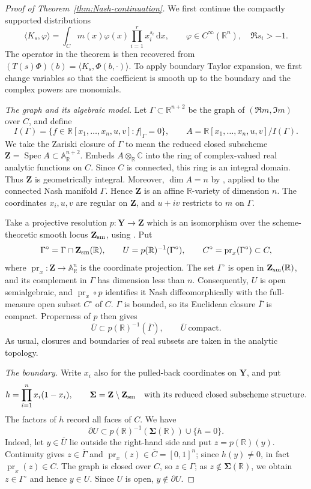 \documentclass[a4paper,12pt]{amsart}
\numberwithin{equation}{section}
\theoremstyle{definition}
\theoremstyle{remark}
\newcommand{\R}{\mathbb R}
\newcommand{\C}{\mathbb C}
\newcommand{\pr}{\operatorname{pr}}
\newcommand{\dd}{\mathrm d}
\begin{document}
\begin{proof}[Proof of Theorem~\ref{thm:Nash-continuation}]
We first continue the compactly supported distributions
\[
 \langle K_s,\varphi\rangle
 =\int_Cm(x)\varphi(x)\prod_{i=1}^r x_i^{s_i}\,\dd x,
 \qquad \varphi\in C^\infty(\R^n),\quad \Re s_i>-1.
\]
The operator in the theorem is then recovered from
$(T(s)\Phi)(b)=\langle K_s,\Phi(b,\cdot)\rangle$.
To apply boundary Taylor expansion, we first change variables so that the coefficient is smooth up to the boundary and the complex powers are monomials.

\emph{The graph and its algebraic model.}
Let $\Gamma\subset\R^{n+2}$ be the graph of $(\Re m,\Im m)$ over $C$, and define
\[
 I(\Gamma)=\{f\in\R[x_1,\ldots,x_n,u,v]:f|_\Gamma=0\},
 \qquad
 A=\R[x_1,\ldots,x_n,u,v]/I(\Gamma).
\]
We take the Zariski closure of $\Gamma$ to mean the reduced closed subscheme
$\mathbf Z=\operatorname{Spec}A\subset\mathbb A^{n+2}_{\R}$.
Embeds $A\otimes_\R\C$ into the ring of complex-valued real analytic functions on $C$. Since $C$ is connected, this ring is an integral domain. Thus $\mathbf Z$ is geometrically integral. Moreover, $\dim A=n$ by \cite[Proposition~8.4.1(i)]{BCR98}, applied to the connected Nash manifold $\Gamma$. Hence $\mathbf Z$ is an affine $\R$-variety of dimension $n$.
The coordinates $x_i,u,v$ are regular on $\mathbf Z$, and $u+iv$ restricts to $m$ on $\Gamma$.

Take a projective resolution $p:\mathbf Y\to\mathbf Z$ which is an isomorphism over the scheme-theoretic smooth locus $\mathbf Z_{\rm sm}$, using \cite[Theorem~36]{Kol07}. Put
\[
 \Gamma^\circ=\Gamma\cap\mathbf Z_{\rm sm}(\R),\qquad
 U=p(\R)^{-1}(\Gamma^\circ),\qquad
 C^\circ=\pr_x(\Gamma^\circ)\subset C,
\]
where $\pr_x:\mathbf Z\to\mathbb A^n_\R$ is the coordinate projection.
The set $\Gamma^\circ$ is open in $\mathbf Z_{\rm sm}(\R)$, and its complement in $\Gamma$ has dimension less than $n$. Consequently, $U$ is open semialgebraic, and $\pr_x\circ p$ identifies it Nash diffeomorphically with the full-measure open subset $C^\circ$ of $C$.
$\Gamma$ is bounded, so its Euclidean closure $\overline{\Gamma}$ is compact. Properness of $p$ then gives
\[
 \overline U\subset p(\R)^{-1}(\overline\Gamma),
 \qquad \overline U\ \text{compact}.
\]
As usual, closures and boundaries of real subsets are taken in the analytic topology.

\emph{The boundary.}
Write $x_i$ also for the pulled-back coordinates on $\mathbf Y$, and put
\[
 h=\prod_{i=1}^n x_i(1-x_i),\qquad
 \boldsymbol\Sigma=\mathbf Z\setminus\mathbf Z_{\rm sm}
 \quad\text{with its reduced closed subscheme structure}.
\]
The factors of $h$ record all faces of $C$. We have
\[
 \partial U\subset p(\R)^{-1}(\boldsymbol\Sigma(\R))\cup\{h=0\}.
\]
Indeed, let $y\in\overline U$ lie outside the right-hand side and put $z=p(\R)(y)$. Continuity gives $z\in\overline\Gamma$ and $\pr_x(z)\in\overline C=[0,1]^n$; since $h(y)\ne0$, in fact $\pr_x(z)\in C$. The graph is closed over $C$, so $z\in\Gamma$; as $z\notin\boldsymbol\Sigma(\R)$, we obtain $z\in\Gamma^\circ$ and hence $y\in U$. Since $U$ is open, $y\notin\partial U$.


\end{proof}
\end{document}
